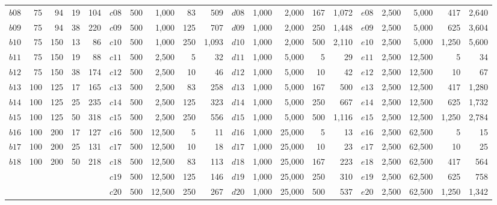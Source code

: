 \documentclass[journal]{IEEEtran}
\begin{document}
\begin{table}[h]
\begin{adjustbox}{width=\textwidth}
\begin{tabular}{lrrrr|lrrrr|lrrrr|lrrrr}
$b08$ & 75 & 94 & 19 & 104& $c08$ & 500 & 1,000 & 83 & 509&  $d08$ & 1,000 & 2,000 & 167 & 1,072& $e08$ & 2,500 & 5,000 & 417 & 2,640\\
$b09$ & 75 & 94 & 38 & 220& $c09$ & 500 & 1,000 & 125 & 707&  $d09$ & 1,000 & 2,000 & 250 & 1,448& $e09$ & 2,500 & 5,000 & 625 & 3,604\\
$b10$ & 75 & 150 & 13 & 86& $c10$ & 500 & 1,000 & 250 &1,093&  $d10$ & 1,000 & 2,000 & 500 & 2,110& $e10$ & 2,500 & 5,000 & 1,250 &5,600\\
$b11$ & 75 & 150 & 19 & 88& $c11$ & 500 & 2,500 & 5 &32&  $d11$ & 1,000 & 5,000 & 5 & 29& $e11$ & 2,500 & 12,500 & 5 &34\\
$b12$ & 75 & 150 & 38 & 174& $c12$ & 500 & 2,500 & 10 & 46&  $d12$ & 1,000 & 5,000 & 10 & 42& $e12$ & 2,500 & 12,500 & 10 & 67\\
$b13$ & 100 & 125 & 17 & 165& $c13$ & 500 & 2,500 & 83 & 258&  $d13$ & 1,000 & 5,000 & 167 & 500& $e13$ & 2,500 & 12,500 & 417 & 1,280\\
$b14$ & 100 & 125 & 25 & 235& $c14$ & 500 & 2,500 & 125 & 323&  $d14$ & 1,000 & 5,000 & 250 & 667& $e14$ & 2,500 & 12,500 & 625 & 1,732\\
$b15$ & 100 & 125 & 50 & 318& $c15$ & 500 & 2,500 & 250 & 556&  $d15$ & 1,000 & 5,000 & 500 & 1,116& $e15$ & 2,500 & 12,500 & 1,250 & 2,784\\
$b16$ & 100 & 200 & 17 & 127& $c16$ & 500 & 12,500 & 5 & 11&  $d16$ & 1,000 & 25,000 & 5 & 13& $e16$ & 2,500 & 62,500 & 5 & 15\\
$b17$ & 100 & 200 & 25 & 131& $c17$ & 500 & 12,500 & 10 & 18&  $d17$ & 1,000 & 25,000 & 10 & 23& $e17$ & 2,500 & 62,500 & 10 & 25\\
$b18$ & 100 & 200 & 50 & 218& $c18$ & 500 & 12,500 & 83 & 113&  $d18$ & 1,000 & 25,000 & 167 & 223& $e18$ & 2,500 & 62,500 & 417 & 564\\
&&&&& $c19$ & 500 & 12,500 & 125 & 146 &$d19$ & 1,000 & 25,000 & 250 & 310& $e19$ & 2,500 & 62,500 & 625 & 758\\
&&&&& $c20$ & 500 & 12,500 & 250 & 267 &$d20$ & 1,000 & 25,000 & 500 & 537& $e20$ & 2,500 & 62,500 & 1,250 & 1,342\\
\bottomrule
\end{tabular}
\end{adjustbox}
\end{table}
\end{document}
